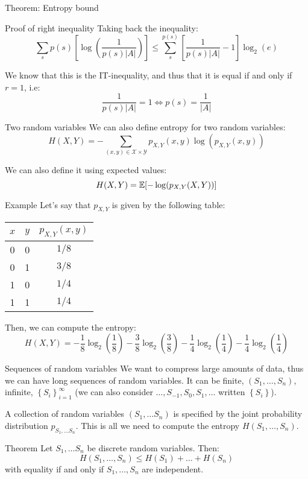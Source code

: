 \documentclass[a4paper]{article}
\begin{document}
\begin{parag}{Theorem: Entropy bound}
\begin{subparag}{Proof of right inequality}
        Taking back the inequality:
        \[\sum_{s}^{} p\left(s\right) \left[\log\left(\frac{1}{p\left(s\right) \left|A\right|}\right)\right] \leq \sum_{s}^{p\left(s\right)} \left[\frac{1}{p\left(s\right) \left|A\right|} - 1\right] \log_2\left(e\right)\]
        
        We know that this is the IT-inequality, and thus that it is equal if and only if $r = 1$, i.e: 
        \[\frac{1}{p\left(s\right) \left|A\right|} = 1 \iff p\left(s\right) = \frac{1}{\left|A\right|}\]
    \end{subparag}
\end{parag}

\begin{parag}{Two random variables}
    We can also define entropy for two random variables: 
    \[H\left(X, Y\right) = -\sum_{\left(x, y\right) \in \mathcal{X} \times \mathcal{Y}}^{} p_{X,Y}\left(x, y\right) \log\left(p_{X,Y}\left(x,y\right)\right)\]

    We can also define it using expected values: 
    \[H\left(X, Y\right) = \exval\left[-\log\left(p_{X,Y}\left(X, Y\right)\right)\right]\]
\end{parag}

\begin{parag}{Example}
    Let's say that $p_{X,Y}$ is given by the following table:
    \begin{center}
    \begin{tabular}{c|c|c}
        $x$ & $y$ & $p_{X,Y}\left(x, y\right)$ \\
        \hline
        0 & 0 & $1 / 8$ \\
        0 & 1 & $3 / 8$ \\
        1 & 0 & $1 / 4$ \\
        1 & 1 & $1 / 4$ \\
    \end{tabular}
    \end{center}

    Then, we can compute the entropy:
    \[H\left(X, Y\right) = -\frac{1}{8} \log_2\left(\frac{1}{8}\right) - \frac{3}{8} \log_2\left(\frac{3}{8}\right) - \frac{1}{4}\log_2\left(\frac{1}{4}\right) - \frac{1}{4}\log_2\left(\frac{1}{4}\right)\]
\end{parag}

\begin{parag}{Sequences of random variables}
    We want to compress large amounts of data, thus we can have long sequences of random variables. It can be finite, $\left(S_1, \ldots, S_n\right)$, infinite, $\left\{S_i\right\}_{i=1}^{\infty}$ (we can also consider $\ldots, S_{-1}, S_{0}, S_{1}, \ldots$ written $\left\{S_i\right\}$).

    A collection of random variables $\left(S_1, \ldots S_n\right)$ is specified by the joint probability distribution $p_{S_1, \ldots S_n}$. This is all we need to compute the entropy $H\left(S_1, \ldots, S_n\right)$.
\end{parag}

\begin{parag}{Theorem}
    Let $S_1, \ldots S_n$ be discrete random variables. Then: 
    \[H\left(S_1, \ldots, S_n\right)\leq H\left(S_1\right) + \ldots+ H\left(S_n\right)\]
    with equality if and only if $S_1, \ldots, S_n$ are independent.
\end{parag}
\end{document}

